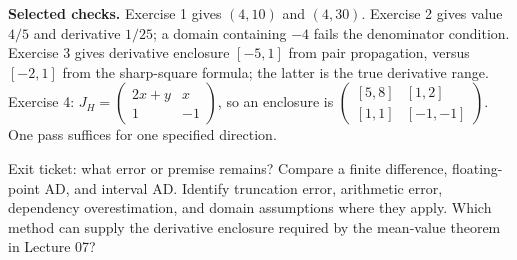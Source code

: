 \textbf{Selected checks.} Exercise 1 gives $(4,10)$ and $(4,30)$.
Exercise 2 gives value $4/5$ and derivative $1/25$; a domain containing
$-4$ fails the denominator condition. Exercise 3 gives derivative enclosure
$[-5,1]$ from pair propagation, versus $[-2,1]$ from the sharp-square
formula; the latter is the true derivative range. Exercise 4:
$J_H=\left(\begin{smallmatrix}2x+y&x\\1&-1\end{smallmatrix}\right)$,
so an enclosure is
$\left(\begin{smallmatrix}[5,8]&[1,2]\\{}[1,1]&[-1,-1]\end{smallmatrix}\right)$.
One pass suffices for one specified direction.

\begin{question}{Exit ticket: what error or premise remains?}
Compare a finite difference, floating-point AD, and interval AD. Identify
truncation error, arithmetic error, dependency overestimation, and domain
assumptions where they apply. Which method can supply the derivative
enclosure required by the mean-value theorem in Lecture 07?
\end{question}



